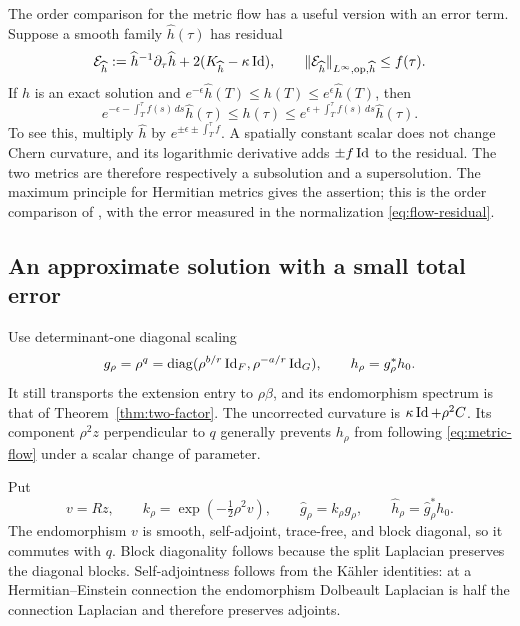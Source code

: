 The order comparison for the metric flow has a useful version with
an error term. Suppose a smooth family $\widehat h(\tau)$ has residual
\begin{equation}\label{eq:flow-residual}
 \mathcal E_{\widehat h}
 :=\widehat h^{-1}\partial_\tau\widehat h
       +2(K_{\widehat h}-\kappa\operatorname{Id}),\qquad
 \lVert\mathcal E_{\widehat h}\rVert_{L^\infty,\mathrm{op},\widehat h}
 \le f(\tau).
\end{equation}
If $h$ is an exact solution and
$e^{-\epsilon}\widehat h(T)\le h(T)\le e^\epsilon\widehat h(T)$,
then
\begin{equation}\label{eq:flow-barriers}
 e^{-\epsilon-\int_T^\tau f(s)\,ds}\widehat h(\tau)
 \le h(\tau)\le
 e^{\epsilon+\int_T^\tau f(s)\,ds}\widehat h(\tau).
\end{equation}
To see this, multiply $\widehat h$ by
$e^{\pm\epsilon\pm\int_T^\tau f}$.
A spatially constant scalar does not change Chern curvature, and its
logarithmic derivative adds $\pm f\operatorname{Id}$ to the residual. The two
metrics are therefore respectively a subsolution and a supersolution.
The maximum principle for Hermitian metrics gives the assertion;
this is the order comparison of
\cite[Section~4.2, Propositions~4.3 and~4.5]{HKKP2018}, with the
error measured in the normalization \eqref{eq:flow-residual}.

\subsection{An approximate solution with a small total error}

Use determinant-one diagonal scaling
\begin{equation}\label{eq:flow-diagonal}
 g_\rho=\rho^q
 =\operatorname{diag}(\rho^{b/r}\operatorname{Id}_F,\rho^{-a/r}\operatorname{Id}_G),\qquad
 h_\rho=g_\rho^*h_0.
\end{equation}
It still transports the extension entry to $\rho\beta$, and its
endomorphism spectrum is that of Theorem~\ref{thm:two-factor}.
The uncorrected curvature is $\kappa\operatorname{Id}+\rho^2C$.
Its component $\rho^2z$ perpendicular to $q$ generally prevents
$h_\rho$ from following \eqref{eq:metric-flow} under a scalar
change of parameter.

Put
\begin{equation}\label{eq:flow-correction}
 v=Rz,\qquad k_\rho=\exp(-\tfrac12\rho^2v),\qquad
 \widehat g_\rho=k_\rho g_\rho,
 \qquad \widehat h_\rho=\widehat g_\rho^*h_0.
\end{equation}
The endomorphism $v$ is smooth, self-adjoint, trace-free, and block
diagonal, so it commutes with $q$. Block diagonality follows because
the split Laplacian preserves the diagonal blocks. Self-adjointness
follows from the K\"ahler identities: at a Hermitian--Einstein
connection the endomorphism Dolbeault Laplacian is half the connection
Laplacian and therefore preserves adjoints.

